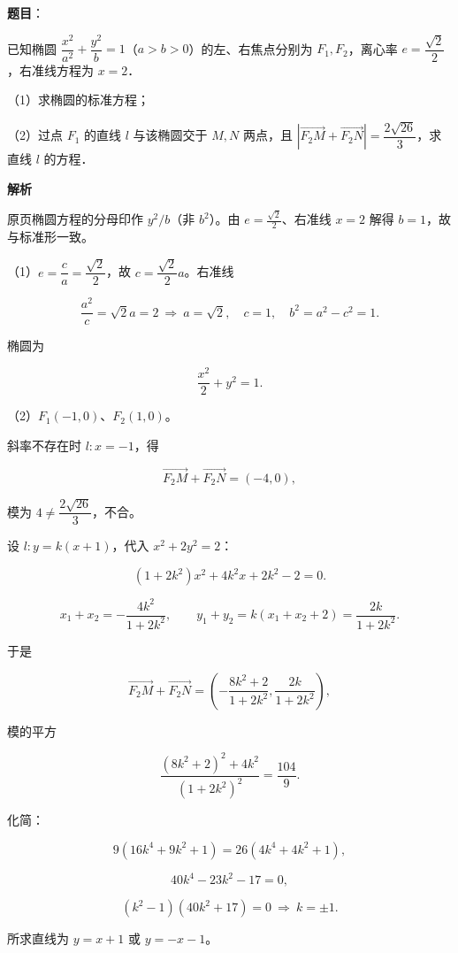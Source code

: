 \begin{answer}

\textbf{题目}：

已知椭圆 $\dfrac{x^2}{a^2}+\dfrac{y^2}{b}=1$（$a>b>0$）的左、右焦点分别为 $F_1,F_2$，离心率 $e=\dfrac{\sqrt2}{2}$，右准线方程为 $x=2$．

（1）求椭圆的标准方程；

（2）过点 $F_1$ 的直线 $l$ 与该椭圆交于 $M,N$ 两点，且 $\left|\overrightarrow{F_2M}+\overrightarrow{F_2N}\right|=\dfrac{2\sqrt{26}}{3}$，求直线 $l$ 的方程．

\textbf{解析}

\begin{gktip}
原页椭圆方程的分母印作 $y^2/b$（非 $b^2$）。由 $e=\frac{\sqrt2}{2}$、右准线 $x=2$ 解得 $b=1$，故与标准形一致。
\end{gktip}

（1）$e=\dfrac ca=\dfrac{\sqrt2}{2}$，故 $c=\dfrac{\sqrt2}{2}a$。右准线

\nopagebreak[4]
\[\frac{a^2}{c}=\sqrt2a=2\ \Longrightarrow\ a=\sqrt2,\quad c=1,\quad b^2=a^2-c^2=1 .\]

椭圆为

\nopagebreak[4]
\[\frac{x^2}{2}+y^2=1 .\]

（2）$F_1(-1,0)$、$F_2(1,0)$。

斜率不存在时 $l:x=-1$，得

\nopagebreak[4]
\[\overrightarrow{F_2M}+\overrightarrow{F_2N}=(-4,0),\]

模为 $4\neq\dfrac{2\sqrt{26}}{3}$，不合。

设 $l:y=k(x+1)$，代入 $x^2+2y^2=2$：

\nopagebreak[4]
\[(1+2k^2)x^2+4k^2x+2k^2-2=0 .\]

\nopagebreak[4]
\[x_1+x_2=-\frac{4k^2}{1+2k^2},\qquad
y_1+y_2=k(x_1+x_2+2)=\frac{2k}{1+2k^2}.\]

于是

\nopagebreak[4]
\[\overrightarrow{F_2M}+\overrightarrow{F_2N}
=\left(-\frac{8k^2+2}{1+2k^2},\frac{2k}{1+2k^2}\right),\]

模的平方

\nopagebreak[4]
\[\frac{(8k^2+2)^2+4k^2}{(1+2k^2)^2}=\frac{104}{9}.\]

化简：

\nopagebreak[4]
\[9\left(16k^4+9k^2+1\right)=26\left(4k^4+4k^2+1\right),\]

\nopagebreak[4]
\[40k^4-23k^2-17=0,\]

\nopagebreak[4]
\[(k^2-1)(40k^2+17)=0\ \Longrightarrow\ k=\pm1 .\]

所求直线为 $y=x+1$ 或 $y=-x-1$。


\end{answer}
